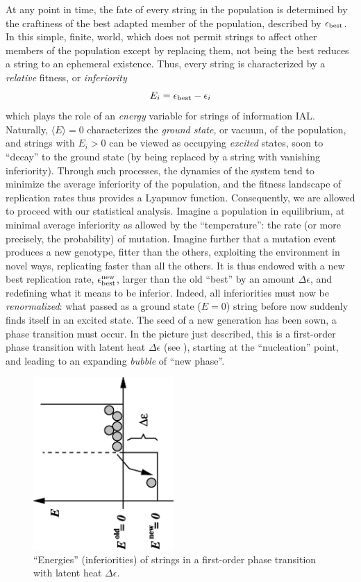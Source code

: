 \documentclass[letterpaper]{article}
\begin{document}
At any point in time, the fate of every string in the population is
determined by the craftiness of the best adapted member of the
population, described by $\epsilon_{\rm best}$. In this simple,
finite, world, which does not permit strings to affect other members
of the population except by replacing them, not being the best reduces
a string to an ephemeral existence. Thus, every string is
characterized by a {\em relative} fitness, or {\em inferiority}
\begin{equation}
    E_i=\epsilon_{\rm best}-\epsilon_i
\end{equation}
which plays the role of an {\em energy} variable for strings of
information {IAL}. Naturally, $\langle E\rangle=0$ characterizes the
{\em ground state}, or vacuum, of the population, and strings with
$E_i>0$ can be viewed as occupying {\em excited} states, soon to
``decay'' to the ground state (by being replaced by a string with
vanishing inferiority). Through such processes, the dynamics of the
system tend to minimize the average inferiority of the population, and
the fitness landscape of replication rates thus provides a Lyapunov
function. Consequently, we are allowed to proceed with our statistical
analysis. Imagine a population in equilibrium, at minimal average
inferiority as allowed by the ``temperature'': the rate (or more
precisely, the probability) of mutation. Imagine further that a
mutation event produces a new genotype, fitter than the others,
exploiting the environment in novel ways, replicating faster than all
the others. It is thus endowed with a new best replication rate,
$\epsilon_{\rm best}^{\rm new}$, larger than the old ``best'' by an
amount $\Delta \epsilon$, and redefining what it means to be
inferior. Indeed, all inferiorities must now be {\em renormalized}:
what passed as a ground state ($E=0$) string before now suddenly finds
itself in an excited state. The seed of a new generation has been
sown, a phase transition must occur. In the picture just described,
this is a first-order phase transition with latent heat
$\Delta\epsilon$ (see ), starting at the ``nucleation''
point, and leading to an expanding {\em bubble} of ``new phase''.

\begin{figure}
    \centering
    \includegraphics[width=2.1in,angle=-90]{fig1.eps}
    \caption{
        ``Energies'' (inferiorities) of strings in a first-order
        phase transition with latent heat $\Delta\epsilon$.
    }
    \label{fig1}
\end{figure}
\end{document}

